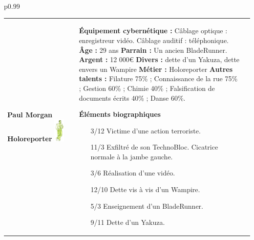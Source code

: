 \documentclass[11pt,twoside,a4paper]{article}
\begin{document}
\begin{longtable}[ht]{ p{} }
	
		\hline
	\begin{tabular}[h]{ p{} p{} p{} }
		\textbf{Paul Morgan}										\newline
		\textbf{\small Holoreporter}								\newline
			\newline
		\includegraphics[width=0.15\textwidth]{img/personnagePaulMorgan.jpg}		
			\newline
			
		& %
			
		\textbf{{\'E}quipement cybern{\'e}tique : }C{\^a}blage optique : enregistreur vid{\'e}o. C{\^a}blage auditif : t{\'e}l{\'e}phonique. \newline
		\textbf{{\^A}ge : } 29 ans 											\newline
		\textbf{Parrain : } Un ancien BladeRunner. 							\newline
		\textbf{Argent : } 12 000\euro 										\newline
		\textbf{Divers : } dette d'un Yakuza, dette envers un Wampire		\newline
		\textbf{M{\'e}tier : } Holoreporter									\newline
		\textbf{Autres talents : } Filature 75\% ; Connaissance de la rue 75\% ; Gestion 60\% ; Chimie 40\% ; Falsification de documents {\'e}crits 40\% ; Danse 60\%. \newline
		
		\textbf{{\'E}l{\'e}ments biographiques}
		\begin{itemize}
			\item[3/12] Victime d'une action terroriste. 
			\item[11/3] Exfiltr{\'e} de son TechnoBloc. Cicatrice normale {\`a} la jambe gauche. 
			\item[3/6] R{\'e}alisation d'une vid{\'e}o. 
			\item[12/10] Dette vis {\`a} vis d'un Wampire. 
			\item[5/3] Enseignement d'un BladeRunner. 
			\item[9/11] Dette d'un Yakuza. 
		\end{itemize}
		

\end{tabular}
\end{longtable}
\end{document}
